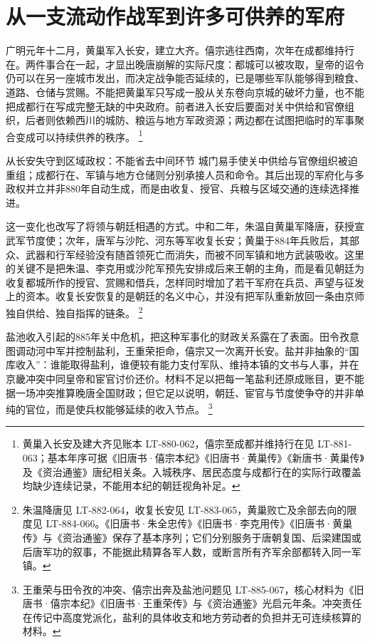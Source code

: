 \section{从一支流动作战军到许多可供养的军府}
\label{sec:regional-polities-and-military-fiscal-order}

广明元年十二月，黄巢军入长安，建立大齐。僖宗逃往西南，次年在成都维持行在。两件事合在一起，才显出晚唐崩解的实际尺度：都城可以被攻取，皇帝的诏令仍可以在另一座城市发出，而决定战争能否延续的，已是哪些军队能够得到粮食、道路、仓储与赏赐。不能把黄巢军只写成一股从关东卷向京城的破坏力量，也不能把成都行在写成完整无缺的中央政府。前者进入长安后要面对关中供给和官僚组织，后者则依赖西川的城防、粮运与地方军政资源；两边都在试图把临时的军事聚合变成可以持续供养的秩序。%
\footnote{黄巢入长安及建大齐见账本 LT-880-062，僖宗至成都并维持行在见 LT-881-063；基本年序可据《旧唐书·僖宗本纪》《旧唐书·黄巢传》《新唐书·黄巢传》及《资治通鉴》唐纪相关条。入城秩序、居民态度与成都行在的实际行政覆盖均缺少连续记录，不能用本纪的朝廷视角补足。}

\begin{causalchain}{从长安失守到区域政权：不能省去中间环节}
城门易手使关中供给与官僚组织被迫重组；成都行在、军镇与地方仓储则分别承接人员和命令。其后出现的军府化与多政权并立并非880年自动生成，而是由收复、授官、兵粮与区域交通的连续选择推进。
\end{causalchain}

这一变化也改写了将领与朝廷相遇的方式。中和二年，朱温自黄巢军降唐，获授宣武军节度使；次年，唐军与沙陀、河东等军收复长安；黄巢于884年兵败后，其部众、武器和行军经验没有随首领死亡而消失，而被不同军镇和地方武装吸收。这里的关键不是把朱温、李克用或沙陀军预先安排成后来王朝的主角，而是看见朝廷为收复都城所作的授官、赏赐和借兵，怎样同时增加了若干军府在兵员、声望与征发上的资本。收复长安恢复的是朝廷的名义中心，并没有把军队重新放回一条由京师独自供给、独自指挥的链条。%
\footnote{朱温降唐见 LT-882-064，收复长安见 LT-883-065，黄巢败亡及余部去向的限度见 LT-884-066。《旧唐书·朱全忠传》《旧唐书·李克用传》《旧唐书·黄巢传》与《资治通鉴》保存了基本序列；它们分别服务于唐朝复国、后梁建国或后唐军功的叙事，不能据此精算各军人数，或断言所有齐军余部都转入同一军镇。}

盐池收入引起的885年关中危机，把这种军事化的财政关系露在了表面。田令孜意图调动河中军并控制盐利，王重荣拒命，僖宗又一次离开长安。盐并非抽象的“国库收入”：谁能取得盐利，谁便较有能力支付军队、维持本镇的文书与人事，并在京畿冲突中同皇帝和宦官讨价还价。材料不足以把每一笔盐利还原成账目，更不能据一场冲突推算晚唐全国财政；但它足以说明，朝廷、宦官与节度使争夺的并非单纯的官位，而是使兵权能够延续的收入节点。%
\footnote{王重荣与田令孜的冲突、僖宗出奔及盐池问题见 LT-885-067，核心材料为《旧唐书·僖宗本纪》《旧唐书·王重荣传》与《资治通鉴》光启元年条。冲突责任在传记中高度党派化，盐利的具体收支和地方劳动者的负担并无可连续核算的材料。}

